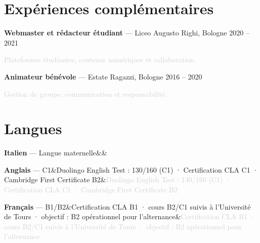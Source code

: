\documentclass[a4paper,10pt]{article}
\newcommand{\langentry}[3]{\noindent\textbf{#1} — #2\ifx&#3&\else\hfill\textcolor{lightgray}{\small #3}\fi\par\vspace{0.15em}}
\begin{document}
\section{Expériences complémentaires}
\textbf{Webmaster et rédacteur étudiant} — Liceo Augusto Righi, Bologne \hfill \textcolor{accent}{2020 -- 2021}\par
\textcolor{lightgray}{\small Plateformes étudiantes, contenus numériques et collaboration.}\par
\textbf{Animateur bénévole} — Estate Ragazzi, Bologne \hfill \textcolor{accent}{2016 -- 2020}\par
\textcolor{lightgray}{\small Gestion de groupe, communication et responsabilité.}

\section{Langues}
\langentry{Italien}{Langue maternelle}{}
\langentry{Anglais}{C1}{Duolingo English Test : 130/160 (C1) · Certification CLA C1 · Cambridge First Certificate B2}
\langentry{Français}{B1/B2}{Certification CLA B1 · cours B2/C1 suivis à l'Université de Tours · objectif : B2 opérationnel pour l'alternance}
\end{document}
